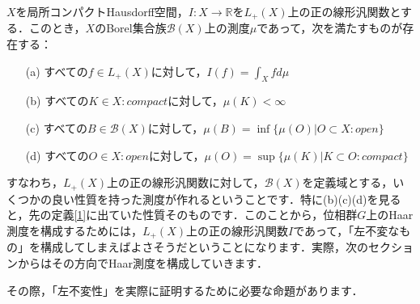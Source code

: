\begin{ythm}[Rieszの表現定理]\label{9}
$X$を局所コンパクトHausdorff空間，$I \colon X \to \mathbb{R}$を$L_{+}(X)$上の正の線形汎関数とする．このとき，$X$のBorel集合族$\mathscr{B}(X)$上の測度$\mu$であって，次を満たすものが存在する：
\begin{itemize}
 \item[(a)]すべての$f \in L_{+}(X)$に対して，$I(f)=\int_{X}fd\mu$
 \item[(b)]すべての$K \in X \colon compact$に対して，$\mu(K)<\infty$
 \item[(c)]すべての$B \in \mathscr{B}(X)$に対して，$\mu(B)=\inf \{ \mu(O) | O \subset X \colon open \}$
 \item[(d)]すべての$O \in X \colon open$に対して，$\mu(O)=\sup \{ \mu(K) | K \subset O \colon compact \}$
\end{itemize}
\end{ythm}
すなわち，$L_{+}(X)$上の正の線形汎関数に対して，$\mathscr{B}(X)$を定義域とする，いくつかの良い性質を持った測度が作れるということです．特に(b)(c)(d)を見ると，先の定義\ref{1}に出ていた性質そのものです．このことから，位相群$G$上のHaar測度を構成するためには，$L_{+}(X)$上の正の線形汎関数$I$であって，「左不変なもの」を構成してしまえばよさそうだということになります．実際，次のセクションからはその方向でHaar測度を構成していきます．

その際，「左不変性」を実際に証明するために必要な命題があります．


